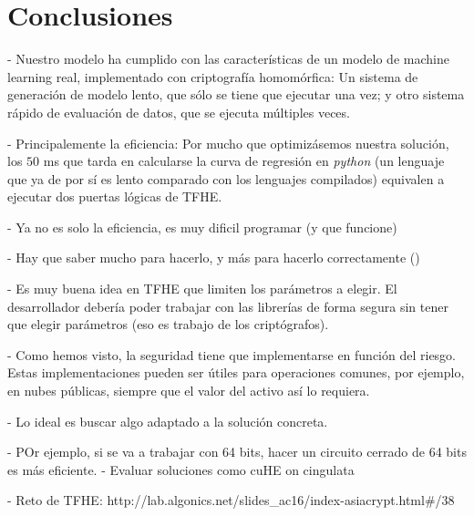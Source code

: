 \chapter{Conclusiones}
\label{chap:conclusiones}

- Nuestro modelo ha cumplido con las características de un modelo de machine learning real, implementado con criptografía homomórfica: Un sistema de generación de modelo lento, que sólo se tiene que ejecutar una vez; y otro sistema rápido de evaluación de datos, que se ejecuta múltiples veces.

- Principalemente la eficiencia: Por mucho que optimizásemos nuestra solución, los $50$ ms que tarda en calcularse la curva de regresión en \textit{python} (un lenguaje que ya de por sí es lento comparado con los lenguajes compilados) equivalen a ejecutar dos puertas lógicas de TFHE.


- Ya no es solo la eficiencia, es muy dificil programar (y que funcione)

- Hay que saber mucho para hacerlo, y más para hacerlo correctamente (\cite{peng_danger_2019})

- Es muy buena idea en TFHE que limiten los parámetros a elegir. El desarrollador debería poder trabajar con las librerías de forma segura sin tener que elegir parámetros (eso es trabajo de los criptógrafos).

- Como hemos visto, la seguridad tiene que implementarse en función del riesgo. Estas implementaciones pueden ser útiles para operaciones comunes, por ejemplo, en nubes públicas, siempre que el valor del activo así lo requiera.


- Lo ideal es buscar algo adaptado a la solución concreta.

    - POr ejemplo, si se va a trabajar con 64 bits, hacer un circuito cerrado de 64 bits es más eficiente.
- Evaluar soluciones como cuHE on cingulata


- Reto de TFHE: http://lab.algonics.net/slides_ac16/index-asiacrypt.html#/38


